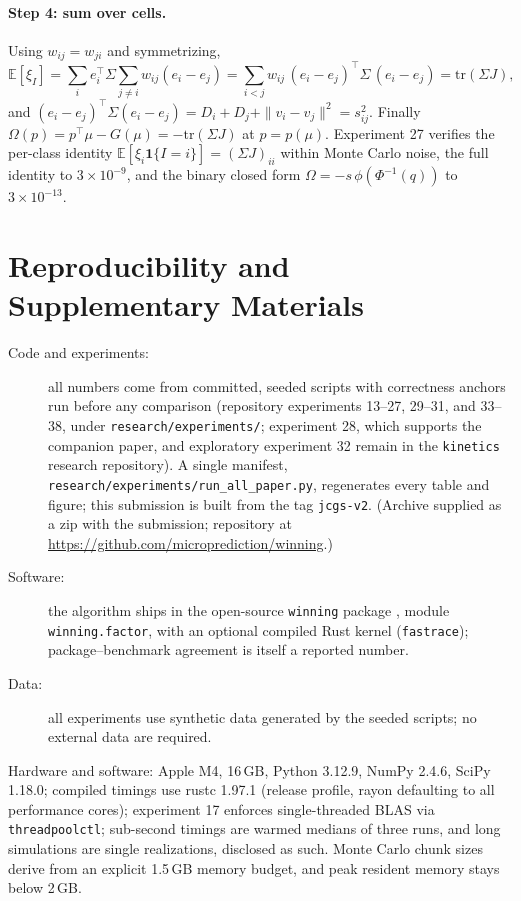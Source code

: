 \documentclass[12pt]{article}
\theoremstyle{remark}
\newcommand{\E}{\mathbb{E}}
\begin{document}
\paragraph{Step 4: sum over cells.} Using $w_{ij} = w_{ji}$ and
symmetrizing,
\[
\E[\xi_I] = \sum_i e_i^\top \Sigma \sum_{j\ne i} w_{ij}(e_i - e_j)
= \sum_{i<j} w_{ij}\, (e_i - e_j)^\top \Sigma\, (e_i - e_j)
= \mathrm{tr}(\Sigma J),
\]
and $(e_i - e_j)^\top \Sigma (e_i - e_j) = D_i + D_j + \|v_i -
v_j\|^2 = s_{ij}^2$. Finally $\Omega(p) = p^\top \mu - G(\mu) =
-\mathrm{tr}(\Sigma J)$ at $p = p(\mu)$. Experiment 27 verifies the
per-class identity $\E[\xi_i \mathbf{1}\{I=i\}] = (\Sigma J)_{ii}$
within Monte Carlo noise, the full identity to $3\times10^{-9}$, and
the binary closed form $\Omega = -s\,\phi(\Phi^{-1}(q))$ to
$3\times10^{-13}$.

\section*{Reproducibility and Supplementary Materials}
\sloppy

\begin{description}
\item[Code and experiments:] all numbers come from committed, seeded
scripts with correctness anchors run before any comparison (repository
experiments 13--27, 29--31, and 33--38, under
\texttt{research/experiments/}; experiment 28, which supports the
companion paper, and exploratory experiment 32 remain in the
\texttt{kinetics} research repository). A single manifest,
\texttt{research/experiments/run\_all\_paper.py}, regenerates every
table and figure; this submission is built from the tag
\texttt{jcgs-v2}. (Archive supplied as a zip with the submission;
repository at \url{https://github.com/microprediction/winning}.)
\item[Software:] the algorithm ships in the open-source
\texttt{winning} package \citep{winningpkg}, module
\texttt{winning.factor}, with an optional compiled Rust kernel
(\texttt{fastrace}); package--benchmark agreement is itself a reported
number.
\item[Data:] all experiments use synthetic data generated by the seeded
scripts; no external data are required.
\end{description}

Hardware and software: Apple M4, 16\,GB, Python 3.12.9,
NumPy 2.4.6, SciPy 1.18.0; compiled timings use rustc 1.97.1
(release profile, rayon defaulting to all performance cores); experiment 17 enforces single-threaded BLAS via
\texttt{threadpoolctl}; sub-second timings are warmed medians of three
runs, and long simulations are single realizations, disclosed as such.
Monte Carlo chunk sizes derive from an explicit 1.5\,GB memory budget, and
peak resident memory stays below 2\,GB.
\end{document}
